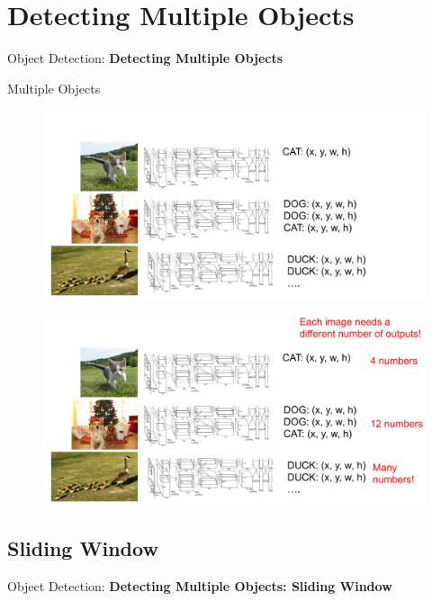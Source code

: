 \section{Detecting Multiple Objects}
\begin{frame}{}
    \LARGE Object Detection: \textbf{Detecting Multiple Objects}
\end{frame}

\begin{frame}[allowframebreaks]{Multiple Objects}

\begin{figure}
\centering
\includegraphics[width=1.0\textwidth,height=1.0\textheight,keepaspectratio]{images/object-detect/object_8.png}
\end{figure}

\framebreak

\begin{figure}
\centering
\includegraphics[width=1.0\textwidth,height=1.0\textheight,keepaspectratio]{images/object-detect/object_9.png}
\end{figure}

\end{frame}

\subsection{Sliding Window}
\begin{frame}{}
    \LARGE Object Detection: \textbf{Detecting Multiple Objects: Sliding Window}
\end{frame}

